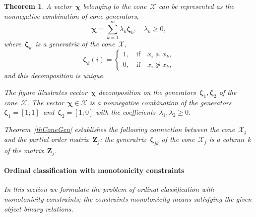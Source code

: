 \documentclass[12pt,preprint]{elsarticle}
\newcommand{\bZ}{\mathbf{Z}}
\newcommand{\bchi}{\boldsymbol{\chi}}
\newcommand{\bzeta}{\boldsymbol{\zeta}}
\newtheorem{Theorem}{Theorem}
\begin{document}
\begin{Theorem}
A vector~$\bchi$ belonging to the cone~$\mathcal{X}$ can be represented as the nonnegative combination of cone generators,
$$\bchi=\sum\limits_{k=1}^{m}\lambda_{k}\bzeta_{k}, \quad\lambda_{k}\geq 0,$$
where~$\bzeta_k$~is a generatrix of the cone~$\mathcal{X}$,
\[
\bzeta_{k}(i)=
\begin{cases}
1,\quad \text{if}\quad x_i\succeq x_k,\\
0,\quad\text{if}\quad x_i\nsucceq x_k,
\end{cases}
\]
and this decomposition is unique.



The figure illustrates vector~$\bchi$ decomposition on the generators~$\bzeta_1,\bzeta_2$ of the cone~$\mathcal{X}$. The vector~$\bchi\in \mathcal{X}$ is a nonnegative combination of the generators~$\bzeta_1=[1;1]$~and~$\bzeta_2=[1;0]$ with the coefficients~$\lambda_1,\lambda_2\geq 0$.

Theorem~\ref{thConeGen} establishes the following connection between the cone~$\mathcal{X}_j$ and the partial order matrix~$\bZ_j$: the generatrix~$\bzeta_{jk}$ of the cone~$\mathcal{X}_j$ is a column~$k$ of the matrix~$\bZ_j$.

\paragraph{Ordinal classification with monotonicity constraints}
In this section we formulate the problem of ordinal classification with monotonicity constraints; the constraints monotonicity means satisfying the given object binary relations.


\end{Theorem}
\end{document}
